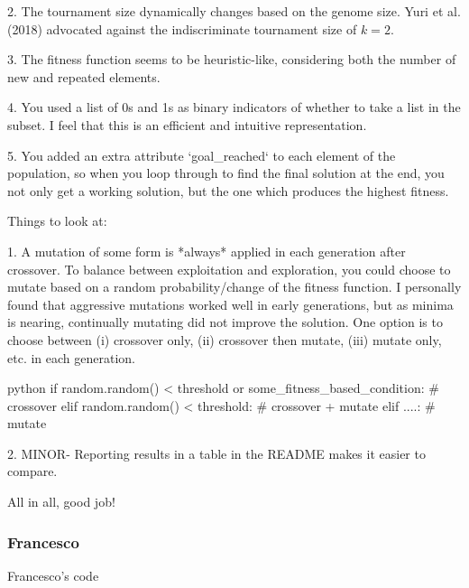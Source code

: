 2. The tournament size dynamically changes based on the genome size. Yuri et al. (2018) advocated against the indiscriminate tournament size of $k=2$.

3. The fitness function seems to be heuristic-like, considering both the number of new and repeated elements.

4. You used a list of 0s and 1s as binary indicators of whether to take a list in the subset. I feel that this is an efficient and intuitive representation.

5. You added an extra attribute `goal\_reached` to each element of the population, so when you loop through to find the final solution at the end, you not only get a working solution, but the one which produces the highest fitness.

Things to look at:

1. A mutation of some form is *always* applied in each generation after crossover. To balance between exploitation and exploration, you could choose to mutate based on a random probability/change of the fitness function. I personally found that aggressive mutations worked well in early generations, but as minima is nearing, continually mutating did not improve the solution. One option is to choose between (i) crossover only, (ii) crossover then mutate, (iii) mutate only, etc. in each generation.

\begin{mintedbox}{python}
if random.random() < threshold or some_fitness_based_condition:
           # crossover
elif random.random() < threshold:
           # crossover + mutate
elif ....:
            # mutate
\end{mintedbox}

2. MINOR- Reporting results in a table in the README makes it easier to compare.

All in all, good job!

\subsubsection{Francesco}

Francesco's code

